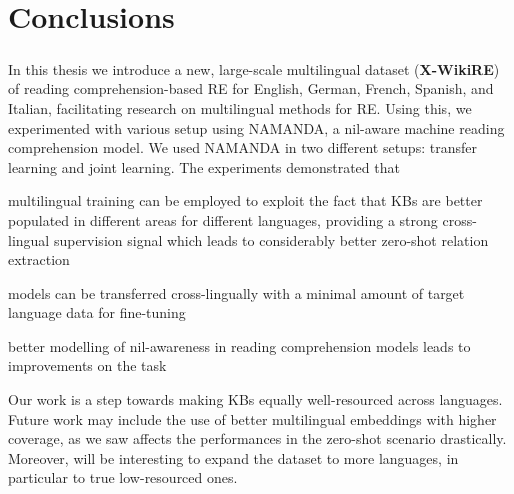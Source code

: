 \chapter{Conclusions}
\label{chpt:7}
\paragraph{}
In this thesis we introduce a new, large-scale multilingual dataset (\textbf{X-WikiRE}) of reading comprehension-based RE for English, German, French, Spanish, and Italian, facilitating research on multilingual methods for RE. Using this, we experimented with various setup using NAMANDA, a nil-aware machine reading comprehension model. We used NAMANDA in two different setups: transfer learning and joint learning. The experiments demonstrated that \begin{enumerate*}[a) , font=\bfseries]
    \item  multilingual training can be employed to exploit the fact that KBs are better populated in different areas for different languages, providing a strong cross-lingual supervision signal which leads to considerably better zero-shot relation extraction
    \item models can be transferred cross-lingually with a minimal amount of target language data for fine-tuning
    \item better modelling of nil-awareness in reading comprehension models leads to improvements on the task
\end{enumerate*}


Our work is a step towards making KBs equally well-resourced across languages. Future work may include the use of better multilingual embeddings with higher coverage, as we saw affects the performances in the zero-shot scenario drastically. Moreover, will be interesting to expand the dataset to more languages, in particular to true low-resourced ones. 


